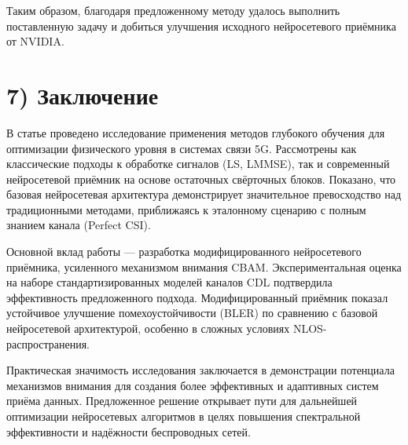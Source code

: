 \documentclass{article}
\begin{document}
Таким образом, благодаря предложенному методу удалось выполнить поставленную задачу и добиться улучшения исходного нейросетевого приёмника от NVIDIA.

\bigskip
\section*{7) Заключение}

В статье проведено исследование применения методов глубокого обучения для оптимизации физического уровня в системах связи 5G. Рассмотрены как классические подходы к обработке сигналов (LS, LMMSE), так и современный нейросетевой приёмник на основе остаточных свёрточных блоков. Показано, что базовая нейросетевая архитектура демонстрирует значительное превосходство над традиционными методами, приближаясь к эталонному сценарию с полным знанием канала (Perfect CSI).

Основной вклад работы — разработка модифицированного нейросетевого приёмника, усиленного механизмом внимания CBAM. Экспериментальная оценка на наборе стандартизированных моделей каналов CDL подтвердила эффективность предложенного подхода. Модифицированный приёмник показал устойчивое улучшение помехоустойчивости (BLER) по сравнению с базовой нейросетевой архитектурой, особенно в сложных условиях NLOS-распространения.

Практическая значимость исследования заключается в демонстрации потенциала механизмов внимания для создания более эффективных и адаптивных систем приёма данных. Предложенное решение открывает пути для дальнейшей оптимизации нейросетевых алгоритмов в целях повышения спектральной эффективности и надёжности беспроводных сетей.

\clearpage


\end{document}
